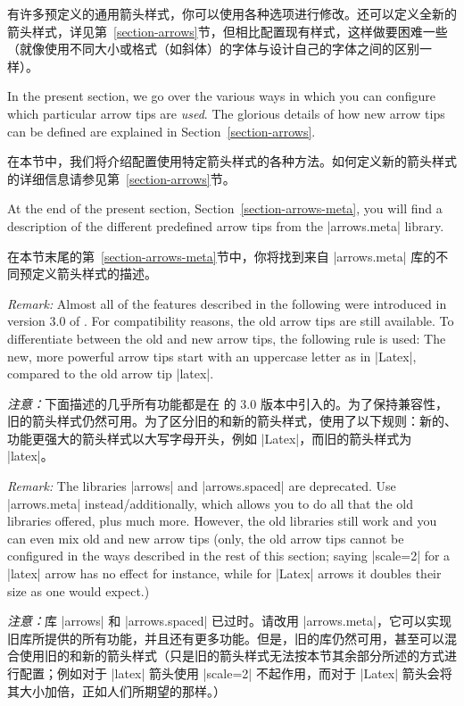 有许多预定义的通用箭头样式，你可以使用各种选项进行修改。还可以定义全新的箭头样式，详见第~\ref{section-arrows}节，但相比配置现有样式，这样做要困难一些（就像使用不同大小或格式（如斜体）的字体与设计自己的字体之间的区别一样）。

In the present section, we go over the various ways in which you can configure
which particular arrow tips are \emph{used}. The glorious details of how new
arrow tips can be defined are explained in Section~\ref{section-arrows}.

在本节中，我们将介绍配置使用特定箭头样式的各种方法。如何定义新的箭头样式的详细信息请参见第~\ref{section-arrows}节。

At the end of the present section, Section~\ref{section-arrows-meta}, you will
find a description of the different predefined arrow tips from the
|arrows.meta| library.

在本节末尾的第~\ref{section-arrows-meta}节中，你将找到来自 |arrows.meta| 库的不同预定义箭头样式的描述。

\emph{Remark:} Almost all of the features described in the following were
introduced in version 3.0 of \tikzname. For compatibility reasons, the old
arrow tips are still available. To differentiate between the old and new arrow
tips, the following rule is used: The new, more powerful arrow tips start with
an uppercase letter as in |Latex|, compared to the old arrow tip |latex|.

\emph{注意：}下面描述的几乎所有功能都是在 \tikzname 的 3.0 版本中引入的。为了保持兼容性，旧的箭头样式仍然可用。为了区分旧的和新的箭头样式，使用了以下规则：新的、功能更强大的箭头样式以大写字母开头，例如 |Latex|，而旧的箭头样式为 |latex|。

\emph{Remark:} The libraries |arrows| and |arrows.spaced| are deprecated. Use
|arrows.meta| instead/additionally, which allows you to do all that the old
libraries offered, plus much more. However, the old libraries still work and
you can even mix old and new arrow tips (only, the old arrow tips cannot be
configured in the ways described in the rest of this section; saying |scale=2|
for a |latex| arrow has no effect for instance, while for |Latex| arrows it
doubles their size as one would expect.)

\emph{注意：}库 |arrows| 和 |arrows.spaced| 已过时。请改用 |arrows.meta|，它可以实现旧库所提供的所有功能，并且还有更多功能。但是，旧的库仍然可用，甚至可以混合使用旧的和新的箭头样式（只是旧的箭头样式无法按本节其余部分所述的方式进行配置；例如对于 |latex| 箭头使用 |scale=2| 不起作用，而对于 |Latex| 箭头会将其大小加倍，正如人们所期望的那样。）


